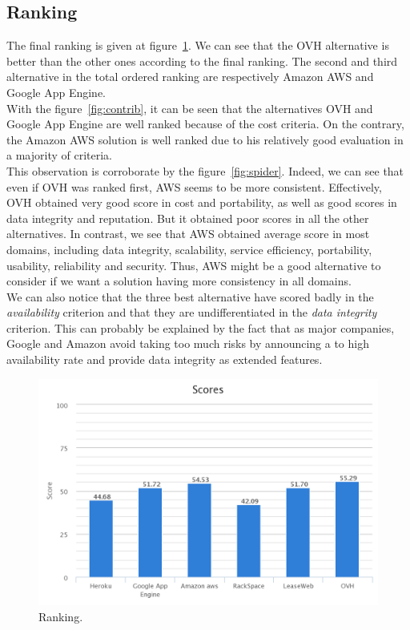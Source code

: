 \documentclass[a4paper,11pt]{article}
\begin{document}
\subsection{Ranking}
The final ranking is given at figure~\ref{fig:ranking}. We can see that the OVH alternative is better than the other ones according to the final ranking. The second and third alternative in the total ordered ranking are respectively Amazon AWS and Google App Engine.\\

With the figure~\ref{fig:contrib}, it can be seen that the alternatives OVH and Google App Engine are well ranked because of the cost criteria. On the contrary, the Amazon AWS solution is well ranked due to his relatively good evaluation in a majority of criteria.\\
This observation is corroborate by the figure~\ref{fig:spider}. Indeed, we can see that even if OVH was ranked first, AWS seems to be more consistent. Effectively, OVH obtained very good score in cost and portability, as well as good scores in data integrity and reputation. But it obtained poor scores in all the other alternatives. In contrast, we see that AWS obtained average score in most domains, including data integrity, scalability, service efficiency, portability, usability, reliability and security. Thus, AWS might be a good alternative to consider if we want a solution having more consistency in all domains.\\

We can also notice that the three best alternative have scored badly in the \emph{availability} criterion and that they are undifferentiated in the \emph{data integrity} criterion. This can probably be explained by the fact that as major companies, Google and Amazon avoid taking too much risks by announcing a to high availability rate and provide data integrity as extended features.\\

\begin{figure}[h]
  \center
  \includegraphics[width=\textwidth-5cm]{img/Result/ranking.png}
  \caption{Ranking.}
  \label{fig:ranking}
\end{figure}
\end{document}

